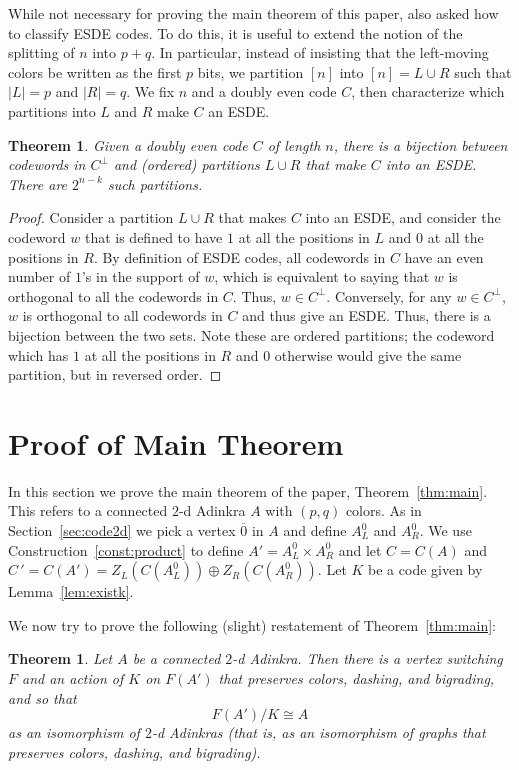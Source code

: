 \documentclass[12pt,twoside,singlespace]{article}
\numberwithin{equation}{section}
\newtheorem{thm}[equation]{Theorem}
\theoremstyle{definition}
\begin{document}
While not necessary for proving the main theorem of this paper, \cite{hubsch:weaving} also asked how to classify ESDE codes.  To do this, it is useful to extend the notion of the splitting of $n$ into $p+q$.  In particular, instead of insisting that the left-moving colors be written as the first $p$ bits, we partition $[n]$ into $[n]=L\cup R$ such that $|L|=p$ and $|R|=q$.  We fix $n$ and a doubly even code $C$, then characterize which partitions into $L$ and $R$ make $C$ an ESDE.

\begin{thm}
\label{thm:esdeclassify}
Given a doubly even code $C$ of length $n$, there is a bijection between codewords in $C^\perp$ and (ordered) partitions $L \cup R$ that make $C$ into an ESDE. There are $2^{n-k}$ such partitions. 
\end{thm}
\begin{proof}
Consider a partition $L \cup R$ that makes $C$ into an ESDE, and consider the codeword $w$ that is defined to have $1$ at all the positions in $L$ and $0$ at all the positions in $R$.  By definition of ESDE codes, all codewords in $C$ have an even number of $1$'s in the support of $w$, which is equivalent to saying that $w$ is orthogonal to all the codewords in $C$. Thus, $w \in C^\perp$.  Conversely, for any $w \in C^\perp$, $w$ is orthogonal to all codewords in $C$ and thus give an ESDE. Thus, there is a bijection between the two sets.  Note these are ordered partitions; the codeword which has $1$ at all the positions in $R$ and $0$ otherwise would give the same partition, but in reversed order.
\end{proof}

\section{Proof of Main Theorem}
\label{sec:quotient}
In this section we prove the main theorem of the paper, Theorem~\ref{thm:main}.  This refers to a connected $2$-d Adinkra $A$ with $(p,q)$ colors.  As in Section~\ref{sec:code2d} we pick a vertex $\overline{0}$ in $A$ and define $A_L^0$ and $A_R^0$.  We use Construction~\ref{const:product} to define $A'=A_L^0\times A_R^0$ and let $C=C(A)$ and $C\,'=C(A')=Z_L(C(A_L^0))\oplus Z_R(C(A_R^0))$.  Let $K$ be a code given by Lemma~\ref{lem:existk}.

We now try to prove the following (slight) restatement of Theorem~\ref{thm:main}:
\begin{thm}
\label{thm:quotient}
Let $A$ be a connected $2$-d Adinkra.  Then there is a vertex switching $F$ and an action of $K$ on $F(A')$ that preserves colors, dashing, and bigrading, and so that
\[F(A')/K\cong A\]
as an isomorphism of $2$-d Adinkras (that is, as an isomorphism of graphs that preserves colors, dashing, and bigrading).
\end{thm}
\end{document}
